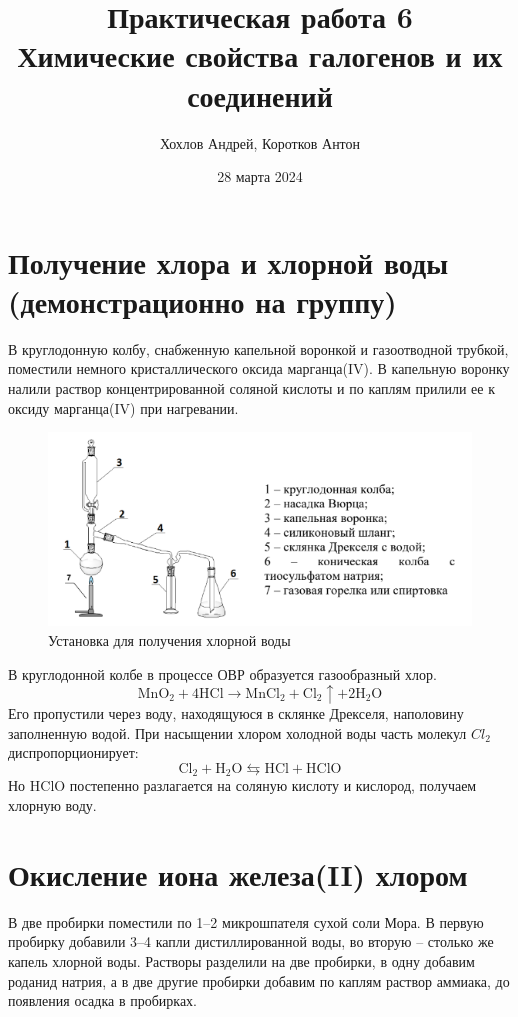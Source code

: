 \documentclass[a4paper,12pt]{article}
\author{Хохлов Андрей, Коротков Антон}
\title{Практическая работа 6 \\
	\textbf{Химические свойства галогенов и их соединений}}
\date{28 марта 2024}
\begin{document}
	
	{\Large \maketitle}
\section{Получение хлора и хлорной воды (демонстрационно на группу)}	
В круглодонную колбу, снабженную капельной воронкой и газоотводной трубкой, поместили
немного кристаллического оксида марганца(IV). В капельную воронку налили раствор
концентрированной соляной кислоты и по каплям прилили ее к оксиду марганца(IV) при
нагревании. 
\begin{figure}[h]

\centering

\includegraphics[scale=1.1]{1.png}

\caption{Установка для получения хлорной воды}

\label{fig:mpr}
\end{figure}
В круглодонной колбе в процессе ОВР образуется газообразный хлор. 
\begin{equation} 
\mathrm{MnO_2+4HCl \longrightarrow MnCl_2 + Cl_2\uparrow + 2H_2O } 
\end{equation}
Его пропустили через воду, находящуюся в склянке Дрекселя, наполовину заполненную водой.
При насыщении хлором холодной воды часть молекул $Cl_2$ диспропорционирует:
\begin{equation} 
\mathrm{Cl_2 + H_2O\leftrightarrows  HCl + HClO} 
\end{equation}
Но $\mathrm{HClO}$ постепенно разлагается на соляную кислоту и кислород, получаем хлорную воду.
\section{Окисление иона железа(II) хлором}
В две пробирки поместили по 1–2 микрошпателя сухой соли Мора. В первую пробирку
добавили 3–4 капли дистиллированной воды, во вторую – столько же капель хлорной воды.
Растворы разделили на две пробирки, в одну добавим роданид натрия, а в две другие пробирки добавим по каплям раствор аммиака, до
появления осадка в пробирках. 
\end{document}
